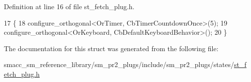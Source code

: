 Definition at line 16 of file st\+\_\+fetch\+\_\+plug.\+h.


\begin{DoxyCode}
17     \{
18         configure\_orthogonal<OrTimer,  CbTimerCountdownOnce>(5);    
19         configure\_orthogonal<OrKeyboard, CbDefaultKeyboardBehavior>();
20     \}
\end{DoxyCode}


The documentation for this struct was generated from the following file\+:\begin{DoxyCompactItemize}
\item 
smacc\+\_\+sm\+\_\+reference\+\_\+library/sm\+\_\+pr2\+\_\+plugs/include/sm\+\_\+pr2\+\_\+plugs/states/\hyperlink{st__fetch__plug_8h}{st\+\_\+fetch\+\_\+plug.\+h}\end{DoxyCompactItemize}
